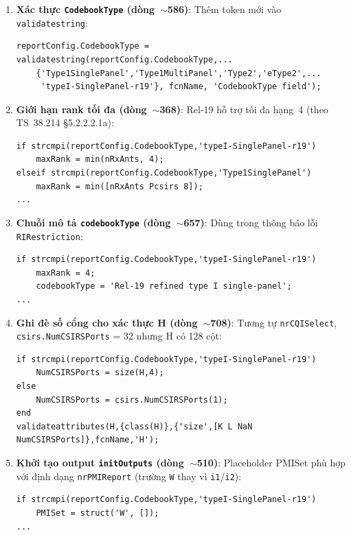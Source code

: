 \documentclass[11pt,a4paper]{article}
\begin{document}
\begin{enumerate}

\item \textbf{Xác thực \texttt{CodebookType} (dòng~$\sim$586)}: Thêm token mới
vào \texttt{validatestring}:
\begin{lstlisting}[style=matlab]
reportConfig.CodebookType = validatestring(reportConfig.CodebookType,...
    {'Type1SinglePanel','Type1MultiPanel','Type2','eType2',...
     'typeI-SinglePanel-r19'}, fcnName, 'CodebookType field');
\end{lstlisting}

\item \textbf{Giới hạn rank tối đa (dòng~$\sim$368)}: Rel-19 hỗ trợ tối đa
hạng~4 (theo TS~38.214 \S5.2.2.2.1a):
\begin{lstlisting}[style=matlab]
if strcmpi(reportConfig.CodebookType,'typeI-SinglePanel-r19')
    maxRank = min(nRxAnts, 4);
elseif strcmpi(reportConfig.CodebookType,'Type1SinglePanel')
    maxRank = min([nRxAnts Pcsirs 8]);
...
\end{lstlisting}

\item \textbf{Chuỗi mô tả \texttt{codebookType} (dòng~$\sim$657)}: Dùng trong
thông báo lỗi \texttt{RIRestriction}:
\begin{lstlisting}[style=matlab]
if strcmpi(reportConfig.CodebookType,'typeI-SinglePanel-r19')
    maxRank = 4;
    codebookType = 'Rel-19 refined type I single-panel';
...
\end{lstlisting}

\item \textbf{Ghi đè số cổng cho xác thực H (dòng~$\sim$708)}: Tương tự
\texttt{nrCQISelect}, \texttt{csirs.NumCSIRSPorts} = 32 nhưng H có 128 cột:
\begin{lstlisting}[style=matlab]
if strcmpi(reportConfig.CodebookType,'typeI-SinglePanel-r19')
    NumCSIRSPorts = size(H,4);
else
    NumCSIRSPorts = csirs.NumCSIRSPorts(1);
end
validateattributes(H,{class(H)},{'size',[K L NaN NumCSIRSPorts]},fcnName,'H');
\end{lstlisting}

\item \textbf{Khởi tạo output \texttt{initOutputs} (dòng~$\sim$510)}: Placeholder
PMISet phù hợp với định dạng \texttt{nrPMIReport} (trường \texttt{W} thay vì
\texttt{i1}/\texttt{i2}):
\begin{lstlisting}[style=matlab]
if strcmpi(reportConfig.CodebookType,'typeI-SinglePanel-r19')
    PMISet = struct('W', []);
...
\end{lstlisting}


\end{enumerate}
\end{document}
